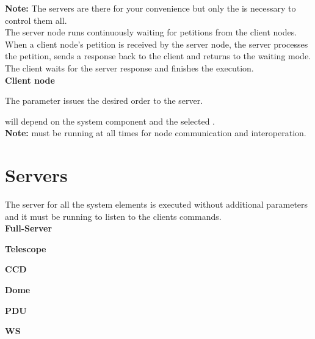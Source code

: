 \documentclass[a4paper,english]{article}
\begin{document}
\noindent 
\textbf{Note:} The  servers are there for your convenience but only the  is necessary to control them all. \\

The server node runs continuously waiting for petitions from the client nodes. When a client node's petition is received by the server node, the server processes the petition, sends a response back to the client and returns to the waiting mode. The client waits for the server response and finishes the execution. \\

\noindent
\textbf{Client node}

The  parameter issues the desired order to the server.

 will depend on the system component and the selected . \\

\noindent
\textbf{Note:}  must be running at all times for node communication and interoperation.


\section{Servers}

The server for all the system elements is executed without additional parameters and it must be running to listen to the clients commands. \\

\noindent
\textbf{Full-Server}

  

\noindent
\textbf{Telescope}
 
  
 
\noindent
\textbf{CCD}

  
 
\noindent
\textbf{Dome}
	 
  

\noindent
\textbf{PDU}
	 
  

\noindent
\textbf{WS}
	 
  
\end{document}
